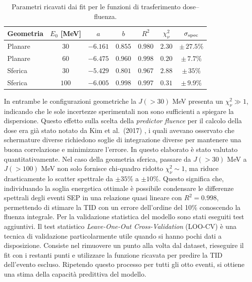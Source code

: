 \documentclass[12pt]{report}
\begin{document}
\begin{table}[t]
\centering
\begin{tabular}{lcccccc}
\hline\hline
Geometria & $E_{0}$ [MeV] & $a$ & $b$ & $R^2$ & $\chi^2_\nu$ & $\sigma_{\rm spec}$ \\
\hline
Planare & $30$  & $-6.161$ & $0.855$ & $0.980$ & $2.30$ & $\pm\,27.5\%$  \\
Planare & $60$  & $-6.475$ & $0.960$ & $0.998$ & $0.20$ & $\pm\,7.7\%$  \\
Sferica & $30$ & $-5.429$ & $0.801$ & $0.967$ & $2.88$ & $\pm\,35\%$ \\
Sferica & $100$ & $-6.005$ & $0.998$ & $0.997$ & $0.31$ & $\pm\,9.9\%$ \\
\hline\hline
\end{tabular}
\caption{Parametri ricavati dai fit per le funzioni di trasferimento dose--fluenza.}
\label{tab:transfer_params}
\end{table}
\noindent In entrambe le configurazioni geometriche la $J(>30)$ MeV presenta un $\chi_{\nu}^2 \gg 1$, indicando che le sole incertezze sperimentali non sono sufficienti a spiegare la dispersione. Questo effetto sulla scelta della \textit{predictor fluence} per il calcolo della dose era già stato notato da Kim et al.\ (2017) \cite{kim2017}, i quali avevano osservato che schermature diverse richiedono soglie di integrazione diverse per mantenere una buona correlazione e minimizzare l'errore. In questo elaborato è stato valutato quantitativamente. Nel caso della geometria sferica, passare da $J(>30)$ MeV a $J(>100)$ MeV non solo fornisce chi-quadro ridotto $\chi_{\nu}^2 \sim 1$, ma riduce drasticamente lo scatter spettrale da $\pm 35\%$ a $\pm 10\%$. Questo significa che, individuando la soglia energetica ottimale è possibile condensare le differenze spettrali degli eventi SEP in una relazione quasi lineare con $R^2 = 0.998$, permettendo di stimare la TID con un errore dell'ordine del 10\% conoscendo la fluenza integrale. Per la validazione statistica del modello sono stati eseguiti test aggiuntivi.
Il test statistico \textit{Leave-One-Out Cross-Validation} (LOO-CV) \cite{sklearn_cross_validation} è una tecnica di validazione particolarmente utile quando si hanno pochi dati a disposizione. Consiste nel rimuovere un punto alla volta dal dataset, rieseguire il fit con i restanti punti e utilizzare la funzione ricavata per predire la TID dell'evento escluso. Ripetendo questo processo per tutti gli otto eventi, si ottiene una stima della capacità predittiva del modello. 
\end{document}
